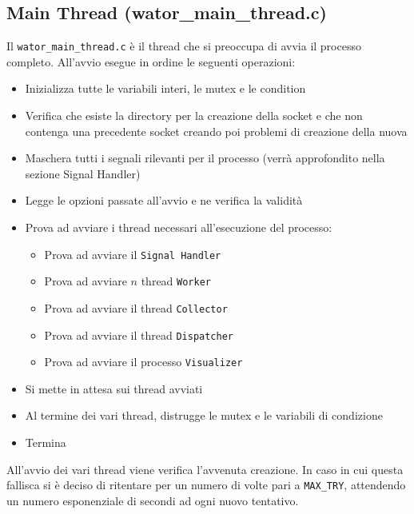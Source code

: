 \documentclass[]{article}
\begin{document}
\subsection{Main Thread (wator\_main\_thread.c)}
Il \texttt{wator\_main\_thread.c} è il thread che si preoccupa di avvia il processo completo. All'avvio esegue in ordine le seguenti operazioni:
\begin{itemize}
	\item Inizializza tutte le variabili interi, le mutex e le condition
	\item Verifica che esiste la directory per la creazione della socket e che non contenga una precedente socket creando poi problemi di creazione della nuova
	\item Maschera tutti i segnali rilevanti per il processo (verrà approfondito nella sezione Signal Handler)
	\item Legge le opzioni passate all'avvio e ne verifica la validità
	\item Prova ad avviare i thread necessari all'esecuzione del processo:
		\begin{itemize}
			\item Prova ad avviare il \texttt{Signal Handler}
			\item Prova ad avviare $n$ thread \texttt{Worker}
			\item Prova ad avviare il thread \texttt{Collector}
			\item Prova ad avviare il thread \texttt{Dispatcher}
			\item Prova ad avviare il processo \texttt{Visualizer}
		\end{itemize}
	\item Si mette in attesa sui thread avviati
	\item Al termine dei vari thread, distrugge le mutex e le variabili di condizione
	\item Termina
\end{itemize}
All'avvio dei vari thread viene verifica l'avvenuta creazione. In caso in cui questa fallisca si è deciso di ritentare per un numero di volte pari a \texttt{MAX\_TRY}, attendendo un numero esponenziale di secondi ad ogni nuovo tentativo. 
\end{document}
